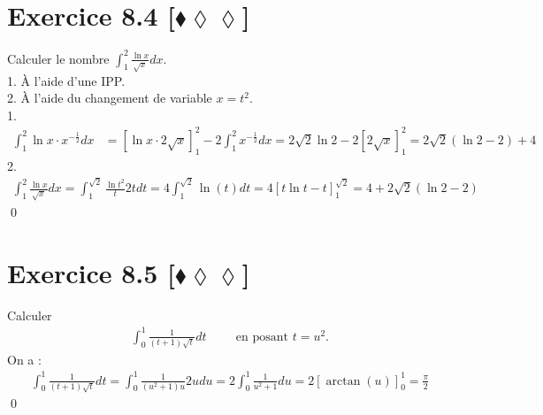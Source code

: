 \documentclass[10pt]{article}
\begin{document}

\section*{Exercice 8.4 [$\blacklozenge\lozenge\lozenge$]}
\begin{tcolorbox}[enhanced, width=7in, center, size=fbox, fontupper=\large, drop shadow southwest]
    Calculer le nombre $\int_1^2{\frac{\ln x}{\sqrt{x}}dx}$.\\
    1. À l'aide d'une IPP.\\
    2. À l'aide du changement de variable $x=t^2$.\\
    1.
    \begin{align*}
        \int_1^2{\ln x\cdot x^{-\frac{1}{2}} dx}&=\left[\ln x \cdot 2\sqrt{x}\right]_1^2 - 2\int_1^2{x^{-\frac{1}{2}}dx}=2\sqrt{2}\ln2-2\left[2\sqrt{x}\right]_1^2=2\sqrt{2}(\ln2-2)+4
    \end{align*}
    2.
    \begin{align*}
        \int_1^2{\frac{\ln x}{\sqrt{x}}dx}=\int_1^{\sqrt{2}}{\frac{\ln t^2}{t}2tdt}=4\int_1^{\sqrt{2}}{\ln(t)dt}=4\left[t\ln t-t\right]_1^{\sqrt{2}}=4+2\sqrt{2}(\ln2-2)
    \end{align*}
    \qed
\end{tcolorbox}


\section*{Exercice 8.5 [$\blacklozenge\lozenge\lozenge$]}
\begin{tcolorbox}[enhanced, width=7in, center, size=fbox, fontupper=\large, drop shadow southwest]
    Calculer
    \begin{align*}
        \int_0^1{\frac{1}{(t+1)\sqrt{t}}dt} \hspace{1cm} \text{en posant }t=u^2.
    \end{align*}
    On a :
    \begin{align*}
       \int_0^1{\frac{1}{(t+1)\sqrt{t}}dt} = \int_0^1{\frac{1}{(u^2+1)u}2udu} = 2\int_0^1{\frac{1}{u^2+1}du}=2\left[\arctan(u)\right]_0^1 = \frac{\pi}{2}
    \end{align*}
    \qed
\end{tcolorbox}

\end{document}
